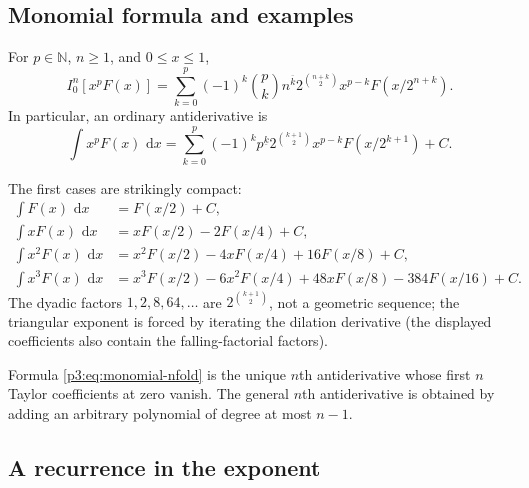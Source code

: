 \documentclass[11pt,oneside]{article}
\theoremstyle{definition}
\theoremstyle{remark}
\newcommand{\N}{\mathbb N}
\newcommand{\dd}{\,\mathrm d}
\newcommand{\fall}[2]{#1^{\underline{#2}}}
\newcommand{\rise}[2]{#1^{\overline{#2}}}
\newcommand{\1}{\mathbf 1}
\begin{document}
\subsection{Monomial formula and examples}

\begin{corollary}[Closed form for $p\in\N$]
\label{p3:cor:monomial}
For $p\in\N$, $n\ge1$, and $0\le x\le1$,
\begin{equation}
 \boxed{
 I_0^n[x^pF(x)]
 =\sum_{k=0}^{p}(-1)^k\binom pk\rise nk
 2^{\binom{n+k}{2}}x^{p-k}F(x/2^{n+k}).}
 \label{p3:eq:monomial-nfold}
\end{equation}
In particular, an ordinary antiderivative is
\begin{equation}
 \boxed{
 \int x^pF(x)\,\dd x
 =\sum_{k=0}^{p}(-1)^k\fall pk
 2^{\binom{k+1}{2}}x^{p-k}F(x/2^{k+1})+C.}
 \label{p3:eq:monomial-antiderivative}
\end{equation}
\end{corollary}

The first cases are strikingly compact:
\begin{align}
 \int F(x)\,\dd x
 &=F(x/2)+C,                                                   \label{p3:eq:example-p0}\\
 \int xF(x)\,\dd x
 &=xF(x/2)-2F(x/4)+C,                                         \label{p3:eq:example-p1}\\
 \int x^2F(x)\,\dd x
 &=x^2F(x/2)-4xF(x/4)+16F(x/8)+C,                             \label{p3:eq:example-p2}\\
 \int x^3F(x)\,\dd x
 &=x^3F(x/2)-6x^2F(x/4)+48xF(x/8)-384F(x/16)+C.               \label{p3:eq:example-p3}
\end{align}
The dyadic factors $1,2,8,64,\ldots$ are $2^{\binom{k+1}{2}}$, not a geometric sequence;
the triangular exponent is forced by iterating the dilation derivative (the displayed
coefficients also contain the falling-factorial factors).

\begin{remark}
Formula \eqref{p3:eq:monomial-nfold} is the unique $n$th antiderivative whose first $n$ Taylor
coefficients at zero vanish.  The general $n$th antiderivative is obtained by adding an
arbitrary polynomial of degree at most $n-1$.
\end{remark}

\subsection{A recurrence in the exponent}
\end{document}
